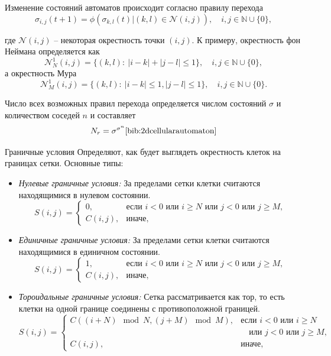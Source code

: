 \documentclass[a4paper, final]{article}
\begin{document}
\noindent Изменение состояний автоматов происходит согласно правилу перехода
$$ \sigma _{i,j}(t+1)=\phi (\sigma _{k,l}(t)|(k,l)\in {\mathcal {N}}(i,j)), \quad i, j \in \mathbb{N} \cup \{0\},$$

\noindent где ${\mathcal {N}}(i,j)$ -- некоторая окрестность точки $(i,j)$. 
К примеру, окрестность фон Неймана определяется как 
$${\mathcal {N}}_{N}^{1}(i,j)=\{(k,l):~|i-k|+|j-l|\leq 1\}, \quad i, j \in \mathbb{N} \cup \{0\},$$
\noindent а окрестность Мура
$$\displaystyle {\mathcal {N}}_{M}^{1}(i,j)=\{(k,l):~|i-k|\leq 1,|j-l|\leq 1\},  \quad i, j \in \mathbb{N} \cup \{0\}.$$

Число всех возможных правил перехода определяется числом состояний 
$\sigma$ и количеством соседей $n$ и составляет 
$$N_{r}=\sigma ^{\sigma ^{n}}\cite{bib:2dcellularautomaton}$$ 

Граничные условия Определяют, как будет выглядеть окрестность клеток на границах сетки. Основные типы:
\begin{itemize}
    \item \textit{Нулевые граничные условия:} За пределами сетки клетки считаются находящимися в нулевом состоянии.
    \[
        S(i, j) = 
        \begin{cases} 
            0, & \text{если } i < 0 \text{ или } i \geq N \text{ или } j < 0 \text{ или } j \geq M, \\
            C(i, j), & \text{иначе},
        \end{cases}
        \]
    \item \textit{Единичные граничные условия:} За пределами сетки клетки считаются находящимися в единичном состоянии.
    \[
        S(i, j) = 
        \begin{cases} 
            1, & \text{если } i < 0 \text{ или } i \geq N \text{ или } j < 0 \text{ или } j \geq M, \\
            C(i, j), & \text{иначе},
        \end{cases}
        \]
    \item \textit{Тороидальные граничные условия:} Сетка рассматривается как тор, то есть клетки на одной границе соединены с противоположной границей.
    \[
        S(i, j) = 
        \begin{cases} 
            C((i + N)\!\!\!\! \mod N, (j + M)\!\!\!\! \mod M), & \text{если } i < 0 \text{ или } i \geq N \\
            & \quad \text{или } j < 0 \text{ или } j \geq M, \\
            C(i, j), & \text{иначе},
        \end{cases}
    \]    
\end{itemize}
\end{document}
